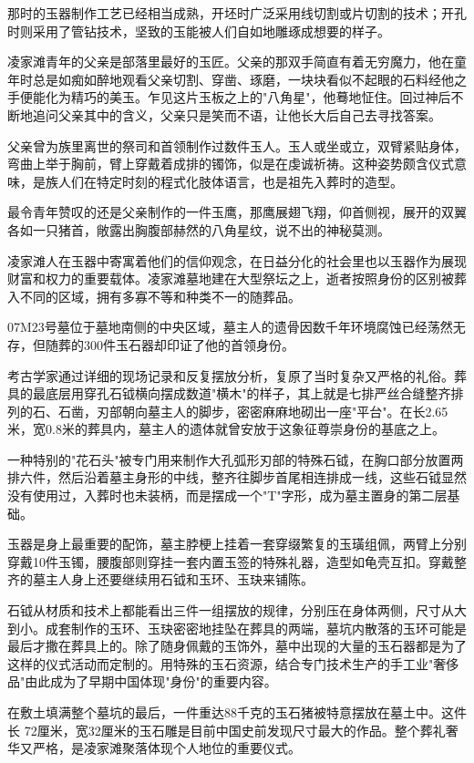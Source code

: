 那时的玉器制作工艺已经相当成熟，开坯时广泛采用线切割或片切割的技术；开孔时则采用了管钻技术，坚致的玉能被人们自如地雕琢成想要的样子。

凌家滩青年的父亲是部落里最好的玉匠。父亲的那双手简直有着无穷魔力，他在童年时总是如痴如醉地观看父亲切割、穿凿、琢磨，一块块看似不起眼的石料经他之手便能化为精巧的美玉。乍见这片玉板之上的"八角星"，他蓦地怔住。回过神后不断地追问父亲其中的含义，父亲只是笑而不语，让他长大后自己去寻找答案。

父亲曾为族里离世的祭司和首领制作过数件玉人。玉人或坐或立，双臂紧贴身体，弯曲上举于胸前，臂上穿戴着成排的镯饰，似是在虔诚祈祷。这种姿势颇含仪式意味，是族人们在特定时刻的程式化肢体语言，也是祖先入葬时的造型。

最令青年赞叹的还是父亲制作的一件玉鹰，那鹰展翅飞翔，仰首侧视，展开的双翼各如一只猪首，敞露出胸腹部赫然的八角星纹，说不出的神秘莫测。

凌家滩人在玉器中寄寓着他们的信仰观念，在日益分化的社会里也以玉器作为展现财富和权力的重要载体。凌家滩墓地建在大型祭坛之上，逝者按照身份的区别被葬入不同的区域，拥有多寡不等和种类不一的随葬品。

07M23号墓位于墓地南侧的中央区域，墓主人的遗骨因数千年环境腐蚀已经荡然无存，但随葬的300件玉石器却印证了他的首领身份。

考古学家通过详细的现场记录和反复摆放分析，复原了当时复杂又严格的礼俗。葬具的最底层用穿孔石钺横向摆成数道"横木"的样子，其上就是七排严丝合缝整齐排列的石、石凿，刃部朝向墓主人的脚步，密密麻麻地砌出一座"平台"。在长2.65米，宽0.8米的葬具内，墓主人的遗体就曾安放于这象征尊崇身份的基底之上。

一种特别的"花石头"被专门用来制作大孔弧形刃部的特殊石钺，在胸口部分放置两排六件，然后沿着墓主身形的中线，整齐往脚步首尾相连排成一线，这些石钺显然没有使用过，入葬时也未装柄，而是摆成一个"T"字形，成为墓主置身的第二层基础。

玉器是身上最重要的配饰，墓主脖梗上挂着一套穿缀繁复的玉璜组佩，两臂上分别穿戴10件玉镯，腰腹部则穿挂一套内置玉签的特殊礼器，造型如龟壳互扣。穿戴整齐的墓主人身上还要继续用石钺和玉环、玉玦来铺陈。

石钺从材质和技术上都能看出三件一组摆放的规律，分别压在身体两侧，尺寸从大到小。成套制作的玉环、玉玦密密地挂坠在葬具的两端，墓坑内散落的玉环可能是最后才撒在葬具上的。除了随身佩戴的玉饰外，墓中出现的大量的玉石器都是为了这样的仪式活动而定制的。用特殊的玉石资源，结合专门技术生产的手工业"奢侈品"由此成为了早期中国体现"身份"的重要内容。

在敷土填满整个墓坑的最后，一件重达88千克的玉石猪被特意摆放在墓土中。这件长 72厘米，宽32厘米的玉石雕是目前中国史前发现尺寸最大的作品。整个葬礼奢华又严格，是凌家滩聚落体现个人地位的重要仪式。

